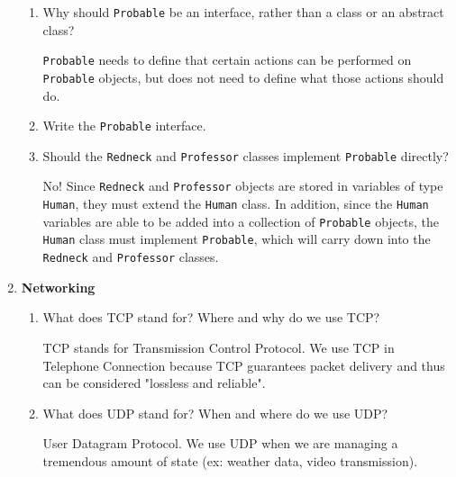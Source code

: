 \documentclass[11pt]{article}
\newenvironment{answer}{\large\lstset{basicstyle=\tiny\ttfamily}\color{white}}{}
\newenvironment{answer}{\large\lstset{basicstyle=\large\ttfamily}\color{red}}{}
\begin{document}
\begin{enumerate}


\pagebreak
\begin{enumerate}
\item Why should \texttt{Probable} be an interface, rather than a class or an abstract class?

\begin{answer}
\texttt{Probable} needs to define that certain actions can be performed on \texttt{Probable} objects, but does not need to define what those actions should do.
\end{answer}

\item Write the \texttt{Probable} interface.

\begin{answer}

\end{answer}

\item Should the \texttt{Redneck} and \texttt{Professor} classes implement \texttt{Probable} directly?

\begin{answer}
No! Since \texttt{Redneck} and \texttt{Professor} objects are stored in variables of type \texttt{Human}, they must extend the \texttt{Human} class.
In addition, since the \texttt{Human} variables are able to be added into a collection of \texttt{Probable} objects, the \texttt{Human} class must implement \texttt{Probable}, which will carry down into the \texttt{Redneck} and \texttt{Professor} classes.
\end{answer}

\end{enumerate}

\item \textbf{Networking} 
	\begin{enumerate}
		\item What does TCP stand for? Where and why do we use TCP?
		
		\begin{answer}
		TCP stands for Transmission Control Protocol. We use TCP in Telephone Connection because TCP guarantees packet delivery and thus can be considered "lossless and reliable".
		\end{answer}
		
		\item What does UDP stand for? When and where do we use UDP?
		
		\begin{answer}
		User Datagram Protocol. We use UDP when we are managing a tremendous amount of state (ex: weather data, video transmission).
		\end{answer}
		

\end{enumerate}
\end{enumerate}
\end{document}
